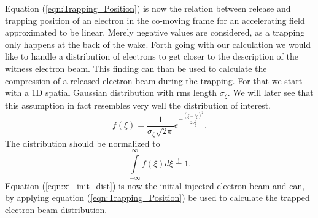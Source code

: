 Equation (\ref{eqn:Trapping_Position}) is now the relation between release and trapping position of an electron in the co-moving frame for an accelerating field approximated to be linear. Merely negative values are considered, as a trapping only happens at the back of the wake.
Forth going with our calculation we would like to handle a distribution of electrons to get closer to the description of the witness electron beam.
This finding can than be used to calculate the compression of a released electron beam during the trapping.
For that we start with a 1D spatial Gaussian distribution  with rms length $\sigma_\xi$. We will later see that this assumption in fact resembles very well the distribution of interest.
\begin{equation}
\label{eqn:xi_init_dist}
f(\xi)=\frac{1}{\sigma_\xi \sqrt{2\pi}}e^{-\frac{(\xi+\delta_\xi)^2}{2\sigma_\xi^2}}.
\end{equation}
The distribution should be normalized to
\begin{equation}
\int \limits_{-\infty}^{\infty} f(\xi)d\xi\stackrel{!}{=}1.
\end{equation}
Equation (\ref{eqn:xi_init_dist}) is now the initial injected electron beam and can, by applying equation (\ref{eqn:Trapping_Position}) be used to calculate the trapped electron beam distribution.

